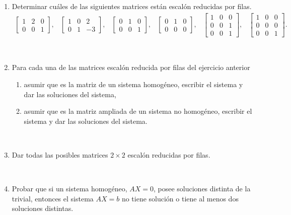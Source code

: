 \documentclass[11pt,spanish,makeidx]{amsbook}
\begin{document}
\begin{enumerate}
\item Determinar cu{\'a}les de las siguientes matrices
est{\'a}n escal\'on reducidas por filas.
$$\begin{array}{lccccl}
\begin{bmatrix}1 & 2 & 0 \\0 & 0 & 1 \end{bmatrix}, &
\begin{bmatrix}1 & 0 & 2 \\0 & 1 & -3 \end{bmatrix}, &
\begin{bmatrix}0 & 1 & 0 \\0 & 0 & 1 \end{bmatrix}, &
\begin{bmatrix}0 & 1 & 0 \\0 & 0 & 0 \end{bmatrix}, &
\begin{bmatrix}1 & 0 & 0  \\0 & 0 & 1 \\0 & 0 & 1 \end{bmatrix},&
\begin{bmatrix}1 & 0 & 0  \\0 & 0 & 0 \\0 & 0 & 1 \end{bmatrix}.
\end{array}$$

\

\item Para cada una de las matrices escal\'on reducida por filas del ejercicio anterior
\begin{enumerate}
\item
asumir que es la matriz de un sistema homog\'eneo, escribir el sistema
y dar las soluciones del sistema,
\item
asumir que es la matriz ampliada de un sistema no homog\'eneo, escribir el sistema
y dar las soluciones del sistema.
\end{enumerate}

\

\item
Dar todas las posibles matrices $2\times2$ escal\'on reducidas por filas.


\

\item Probar que si un sistema homog\'eneo, $AX=0$, posee soluciones
distinta de la trivial, entonces el sistema $AX=b$ no tiene
soluci\'on o tiene al menos dos soluciones distintas.

\vspace{.5cm}


\end{enumerate}
\end{document}
